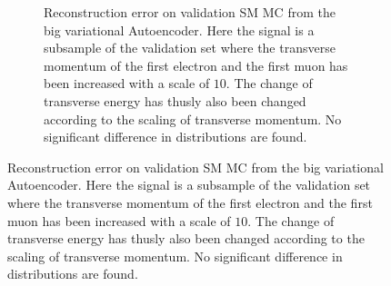 \begin{figure}[h!]
\begin{subfigure}{.45\textwidth}
        \caption{Reconstruction error on validation SM MC from the big variational Autoencoder. Here the signal is a subsample of the validation 
        set where the transverse momentum of the first electron and the first muon has been increased with a scale of $10$. The change of transverse 
        energy has thusly also been changed according to the scaling of transverse momentum. No significant difference in distributions are found. }
        \label{fig:VAE_big_pt_10}
    \end{subfigure}
    \hfill 
    \label{fig:VAE_big_small_pt_10}
\end{figure}

\newpage